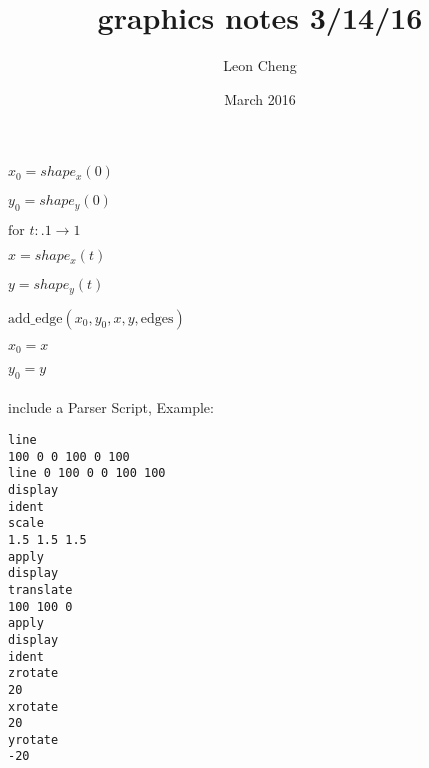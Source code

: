 \documentclass{article}
\title{graphics notes 3/14/16}
\author{Leon Cheng}
\date{March 2016}
\begin{document}
\maketitle

$ x_0 = shape_x (0) $

$ y_0 = shape_y (0) $

$ \text{for }  t: .1 \rightarrow 1$

\quad $x = shape_x(t)$

\quad $y = shape_y(t)$

\quad $ \text{add\_edge} (x_0, y_0, x, y, \text{edges})$

\quad $x_0 = x$

\quad $y_0 = y$
\\\\


include a Parser Script, Example: 
\begin{lstlisting}
line
100 0 0 100 0 100
line 0 100 0 0 100 100
display
ident
scale
1.5 1.5 1.5
apply
display
translate
100 100 0 
apply
display
ident
zrotate
20
xrotate
20
yrotate
-20

\end{lstlisting}
\end{document}
